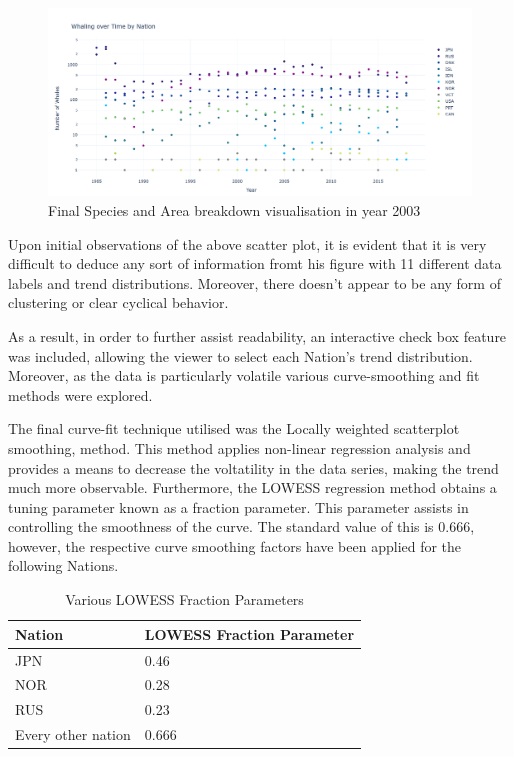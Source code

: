 \documentclass[12pt,a4paper]{article}
\begin{document}
\begin{figure}[H]
    \centering
    \includegraphics[width = 15cm]{AllScatter.png}
    \caption{Final Species and Area breakdown visualisation in year 2003}
    \label{fig:my_label}
\end{figure}

Upon initial observations of the above scatter plot, it is evident that it is very difficult to deduce any sort of information fromt his figure with 11 different data labels and trend distributions. Moreover, there doesn't appear to be any form of clustering or clear cyclical behavior. 

As a result, in order to further assist readability, an interactive check box feature was included, allowing the viewer to select each Nation's trend distribution. Moreover, as the data is particularly volatile various curve-smoothing and fit methods were explored. 

The final curve-fit technique utilised was the Locally weighted scatterplot smoothing, method. This method applies non-linear regression analysis and provides a means to decrease the voltatility in the data series, making the trend much more observable. Furthermore, the LOWESS regression method obtains a tuning parameter known as a fraction parameter. This parameter assists in controlling the smoothness of the curve. The standard value of this is 0.666, however, the respective curve smoothing factors have been applied for the following Nations. 

\begin{table}[H]
\centering
\begin{tabular}{| m{5cm} |m{10cm}|}
\hline
 \textbf{Nation} & \textbf{LOWESS Fraction Parameter}\\ 
 \hline
    JPN & 0.46\\ 
\hline
    NOR & 0.28\\ 
\hline
    RUS & 0.23\\ 
\hline
    Every other nation & 0.666\\ 
\hline
\end{tabular}
 \caption{\label{tab:table1} Various LOWESS Fraction Parameters}
\end{table}
\end{document}
